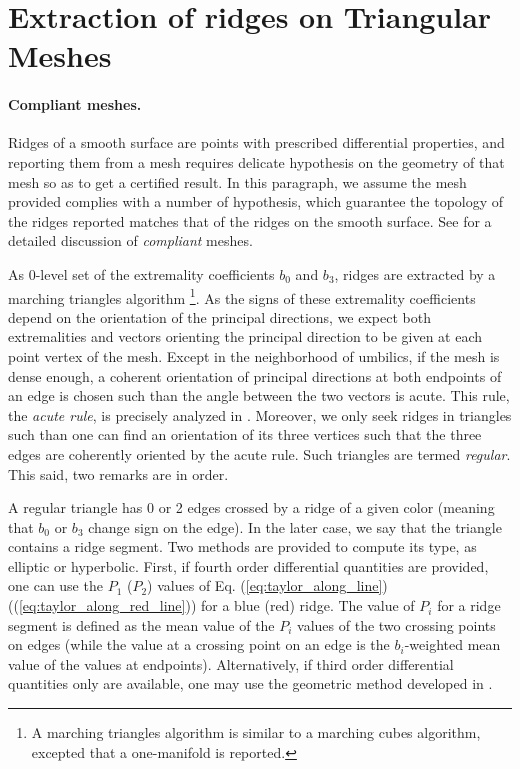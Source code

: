 \section{Extraction of ridges on Triangular Meshes}
\label{ridge-mesh}

\paragraph{Compliant meshes.}
Ridges of a smooth surface are points with prescribed differential
properties, and reporting them from a mesh requires delicate
hypothesis on the geometry of that mesh so as to get a certified
result. In this paragraph, we assume the mesh provided complies with a
number of hypothesis, which guarantee the topology of the ridges
reported matches that of the ridges on the smooth surface. See
\cite{cgal:cp-tdare-05} for a detailed discussion of {\em compliant} meshes.
\medskip

As 0-level set of the extremality coefficients $b_0$ and $b_3$, ridges
are extracted by a marching triangles algorithm \footnote{A marching
triangles algorithm is similar to a marching cubes algorithm, excepted
that a one-manifold is reported.}.
As the signs of these extremality coefficients depend on the
orientation of the principal directions, we expect both extremalities
and vectors orienting the principal direction to be given at each
point vertex of the mesh. Except in the neighborhood of umbilics, if
the mesh is dense enough, a coherent orientation of principal
directions at both endpoints of an edge is chosen such than the angle
between the two vectors is acute. This rule, the {\em acute rule}, is
precisely analyzed in \cite{cgal:cp-tdare-05}.
Moreover, we only seek ridges in triangles such than one can find an
orientation of its three vertices such that the three edges are
coherently oriented by the acute rule. Such triangles are termed
{\em regular}. This said, two remarks are in order.

A regular triangle has 0 or 2 edges crossed by a ridge of a given
color (meaning that $b_0$ or $b_3$ change sign on the edge). In the
later case, we say that the triangle contains a ridge segment.
Two methods are provided to compute its type, as elliptic or
hyperbolic. First, if fourth order differential quantities are
provided, one can use the $P_1$ ($P_2$) values of Eq.
(\ref{eq:taylor_along_line}) ((\ref{eq:taylor_along_red_line})) for
a blue (red) ridge. The value of $P_i$ for a ridge segment is defined
as the mean value of the $P_i$ values of the two crossing points on
edges (while the value at a crossing point on an edge is the
$b_i$-weighted mean value of the values at endpoints).
Alternatively, if third order differential quantities only are
available, one may use the geometric method developed in
\cite{cgal:cp-tdare-05}.


